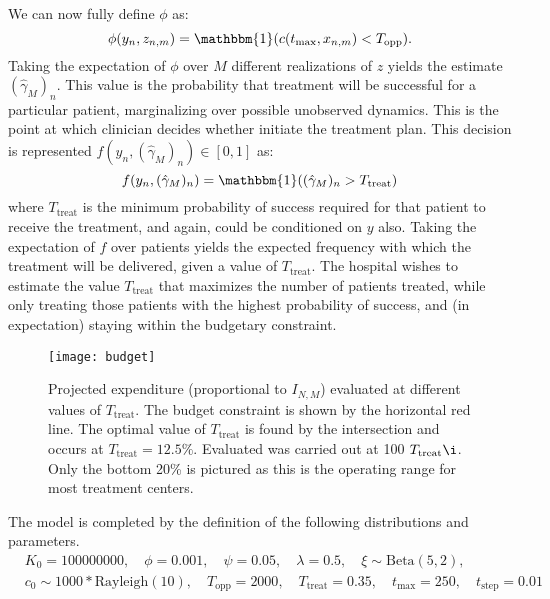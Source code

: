 We can now fully define $\phi$ as:
\begin{equation}
\phi(y_n,z_{n,m}) = \mathbbm{1}(c(t_{\text{max}}, x_{n,m})<T_{\text{opp}}).
\end{equation}
Taking the expectation of $\phi$ over $M$ different realizations of $z$ yields the estimate $(\hat{\gamma}_M)_n$. 
This value is the probability that treatment will be successful for a particular patient, marginalizing over possible unobserved dynamics. This is the point at which clinician decides whether initiate the treatment plan.
This decision is represented $f(y_n,(\hat{\gamma}_M)_n) \in [0,1]$ as:
\begin{equation}
f(y_n,(\hat{\gamma}_M)_n) = \mathbbm{1}((\hat{\gamma}_M)_n>T_{\text{treat}})
\end{equation}
where $T_{\text{treat}}$ is the minimum probability of success required for that patient to receive the treatment, and again, could be conditioned on $y$ also.
Taking the expectation of $f$ over patients yields the expected frequency with which the treatment will be delivered, given a value of $T_{\text{treat}}$. The hospital wishes to estimate the value $T_{\text{treat}}$ that maximizes the number of patients treated, while only treating those patients with the highest probability of success, and (in expectation) staying within the budgetary constraint.

\begin{figure}[t]
	\centering
	\texttt{[image: budget]}
	\caption{Projected expenditure (proportional to $I_{N,M}$) evaluated at different values of $T_{\mathrm{treat}}$. The budget constraint is shown by the horizontal red line. The optimal value of $T_{\mathrm{treat}}$ is found by the intersection 
		and occurs at $T_{\mathrm{treat}} = 12.5\%$. Evaluated was carried out at 100 $T_{\mathrm{treat}} \i$. Only the bottom 20\% is pictured as this is the operating range for most treatment centers. }
	\label{fig:emperical-cost}
\end{figure}

The model is completed by the definition of the following distributions and parameters.
\begin{align*}
& K_0 = 100000000, \quad
\phi = 0.001, \quad
\psi = 0.05, \quad
\lambda = 0.5, \quad
\xi \sim \text{Beta}(5, 2), \\
& c_0 \sim 1000*\text{Rayleigh}(10), \quad
T_{\text{opp}} = 2000,\quad
T_{\text{treat}} = 0.35, \quad
t_{\text{max}} = 250, \quad
t_{\text{step}} = 0.01 
\end{align*}


